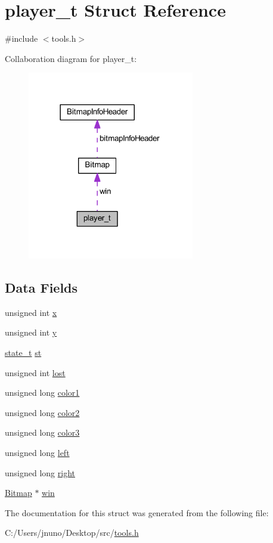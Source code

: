\hypertarget{structplayer__t}{}\section{player\+\_\+t Struct Reference}
\label{structplayer__t}


{\ttfamily \#include $<$tools.\+h$>$}



Collaboration diagram for player\+\_\+t\+:
\nopagebreak
\begin{figure}[H]
\begin{center}
\leavevmode
\includegraphics[width=206pt]{structplayer__t__coll__graph}
\end{center}
\end{figure}
\subsection*{Data Fields}
\begin{DoxyCompactItemize}
\item 
unsigned int \hyperlink{group___game_ga676e0da0ef83bbbdf42538e54b97506b}{x}
\item 
unsigned int \hyperlink{group___game_gac30de26db5f6d1c18c63913729adca7d}{y}
\item 
\hyperlink{group___game_gaa0aafed44fec19806d8f9ad834be1248}{state\+\_\+t} \hyperlink{group___game_ga9a379079ab305d43e4c73334578f9325}{st}
\item 
unsigned int \hyperlink{group___game_ga6325f05cd0c308b41c677ec0709707a4}{lost}
\item 
unsigned long \hyperlink{group___game_gab817949ca924898b4cc07f87e9936c37}{color1}
\item 
unsigned long \hyperlink{group___game_gad66b83194e360e19ab982ad5e92c0e47}{color2}
\item 
unsigned long \hyperlink{group___game_ga4a11e85efa70b04b658bbb13b38331a6}{color3}
\item 
unsigned long \hyperlink{group___game_ga74dc52caaf927df421fcbda624d6db30}{left}
\item 
unsigned long \hyperlink{group___game_gad9567130205b4716d5412d5d936cdeb0}{right}
\item 
\hyperlink{struct_bitmap}{Bitmap} $\ast$ \hyperlink{group___game_ga710a78637db874c6ee469e4a3f339f7f}{win}
\end{DoxyCompactItemize}


The documentation for this struct was generated from the following file\+:\begin{DoxyCompactItemize}
\item 
C\+:/\+Users/jnuno/\+Desktop/src/\hyperlink{tools_8h}{tools.\+h}\end{DoxyCompactItemize}
